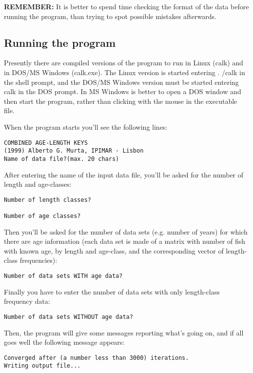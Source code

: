 \documentclass[12pt,a4paper]{article}
\begin{document}
\textbf{REMEMBER:} It is better to spend time checking the format of the data before running the program, than trying to spot possible mistakes afterwards.

\subsection{Running the program}

Presently there are compiled versions of the program to run in Linux (calk) and in DOS/MS Windows (calk.exe). 
The Linux version is started entering . /calk in the shell prompt, and the DOS/MS Windows version must be started 
entering calk in the DOS prompt. In MS Windows is better to open a DOS window and then start the program, rather 
than clicking with the mouse in the executable file.

When the program starts you'll see the following lines:

\begin{verbatim}
COMBINED AGE-LENGTH KEYS
(1999) Alberto G. Murta, IPIMAR - Lisbon 
Name of data file?(max. 20 chars)
\end{verbatim}

After entering the name of the input data file, you'll be asked for the number of length and age-classes:

\begin{verbatim}
Number of length classes? 

Number of age classes?
\end{verbatim}

Then you'll be asked for the number of data sets (e.g. number of years) for which there are age information 
(each data set is made of a matrix with number of fish with known age, by length and age-class, and the corresponding 
vector of length-class frequencies):

\begin{verbatim}
Number of data sets WITH age data?
\end{verbatim}

Finally you have to enter the number of data sets with only length-class frequency data: 

\begin{verbatim}
Number of data sets WITHOUT age data?
\end{verbatim}

Then, the program will give some messages reporting what's going on, and if all goes well the following message appears:

\begin{verbatim}
Converged after (a number less than 3000) iterations. 
Writing output file...
\end{verbatim}
\end{document}
